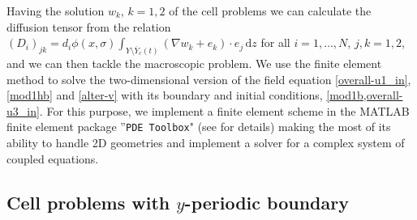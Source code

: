\documentclass[reqno, 11pt]{amsart}
\numberwithin{equation}{section}
\newcommand{\AM}[1]{{\color{brown}#1}}
\newcommand{\di}[1]{\,\mathrm{d}#1}
\begin{document}
 
Having the solution $w_k$, $k=1,2$ of the cell problems we can calculate the diffusion tensor   from the relation
$(D_i)_{jk}=d_i\phi(x,\sigma)\int_{Y\setminus \overline{Y}_c(t)}(\nabla w_{k}+e_{k})\cdot e_j\di{z}$
    for all $i=1,\ldots,N$, $j,k=1,2$, and 
we can then tackle the macroscopic problem.  We use the finite element method to solve the  two-dimensional version of
the field equation \eqref{overall-u1_in}, \eqref{mod1hb} and \eqref{alter-v}
with its boundary and initial conditions, \cref{mod1b,overall-u3_in}.
For this purpose, we implement a finite element scheme in the MATLAB finite element  package ''\texttt{PDE Toolbox}"  (see \cite{pdetoolbox} for details)
making the most of its ability to handle 2D geometries and implement a solver for a complex  system of coupled equations. 


  


\subsection{Cell problems with $y$-periodic boundary}
\end{document}
